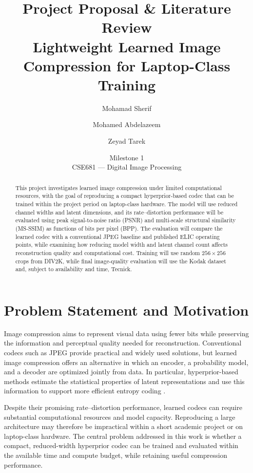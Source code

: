 \documentclass[11pt]{article}
\title{\LARGE Project Proposal \& Literature Review\\[4pt]
       \large Lightweight Learned Image Compression for Laptop-Class Training}
\author{Mohamad Sherif \and Mohamed Abdelazeem \and Zeyad Tarek}
\date{Milestone 1\\CSE681 --- Digital Image Processing}
\begin{document}
\maketitle

\begin{abstract}
This project investigates learned image compression under limited
computational resources, with the goal of reproducing a compact
hyperprior-based codec that can be trained within the project period
on laptop-class hardware. The model will use reduced channel widths
and latent dimensions, and its rate--distortion performance will be
evaluated using peak signal-to-noise ratio (PSNR) and multi-scale
structural similarity (MS-SSIM) as functions of bits per pixel (BPP).
The evaluation will compare the learned codec with a conventional JPEG
baseline and published ELIC operating points, while examining how
reducing model width and latent channel count affects reconstruction
quality and computational cost. Training will use random $256 \times
256$ crops from DIV2K, while final image-quality evaluation will use
the Kodak dataset and, subject to availability and time, Tecnick.
\end{abstract}

\section{Problem Statement and Motivation}

Image compression aims to represent visual data using fewer bits
while preserving the information and perceptual quality needed for
reconstruction. Conventional codecs such as JPEG provide practical
and widely used solutions, but learned image compression offers an
alternative in which an encoder, a probability model, and a decoder
are optimized jointly from data. In particular, hyperprior-based
methods estimate the statistical properties of latent representations
and use this information to support more efficient entropy coding
\citep{balle2018scalehyperprior}.

Despite their promising rate--distortion performance, learned codecs
can require substantial computational resources and model capacity.
Reproducing a large architecture may therefore be impractical within
a short academic project or on laptop-class hardware. The central
problem addressed in this work is whether a compact, reduced-width
hyperprior codec can be trained and evaluated within the available
time and compute budget, while retaining useful compression
performance.
\end{document}
